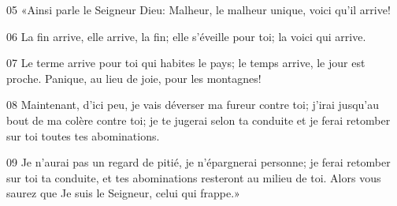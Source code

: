 
05 «Ainsi parle le Seigneur Dieu: Malheur, le malheur unique, voici qu’il arrive!

06 La fin arrive, elle arrive, la fin; elle s’éveille pour toi; la voici qui arrive.

07 Le terme arrive pour toi qui habites le pays; le temps arrive, le jour est proche. Panique, au lieu de joie, pour les montagnes!

08 Maintenant, d’ici peu, je vais déverser ma fureur contre toi; j’irai jusqu’au bout de ma colère contre toi; je te jugerai selon ta conduite et je ferai retomber sur toi toutes tes abominations.

09 Je n’aurai pas un regard de pitié, je n’épargnerai personne; je ferai retomber sur toi ta conduite, et tes abominations resteront au milieu de toi. Alors vous saurez que Je suis le Seigneur, celui qui frappe.»
